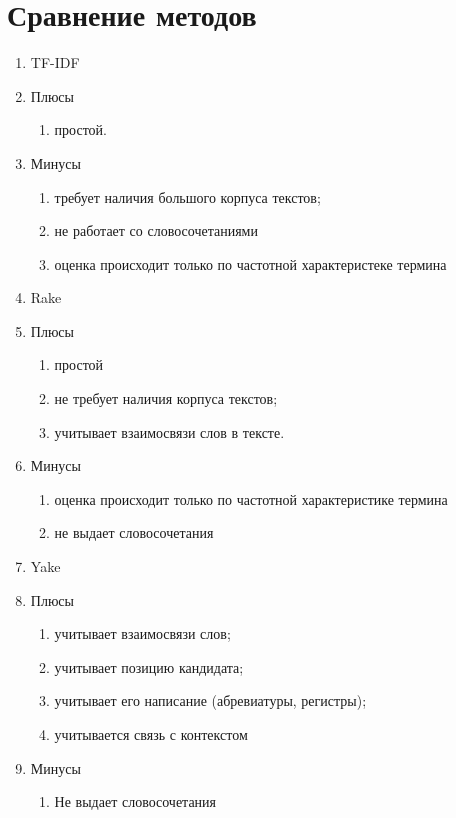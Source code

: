 \section{Сравнение методов}
\begin{enumerate}
	\item TF-IDF
	\item Плюсы \begin{enumerate}
		\item простой.
	\end{enumerate}
	\item Минусы \begin{enumerate}
		\item требует наличия большого корпуса текстов;
		\item не работает со словосочетаниями
		\item оценка происходит только по частотной характеристеке термина
	\end{enumerate}
	\item Rake
	\item Плюсы \begin{enumerate}
		\item простой
		\item не требует наличия корпуса текстов;
		\item учитывает взаимосвязи слов в тексте.
	\end{enumerate}
	\item Минусы \begin{enumerate}
		\item оценка происходит только по частотной характеристике термина
		\item не выдает словосочетания
	\end{enumerate}
	\item Yake
	\item Плюсы \begin{enumerate}
		\item учитывает взаимосвязи слов;
		\item учитывает позицию кандидата;
		\item учитывает его написание (абревиатуры, регистры);
		\item учитывается связь с контекстом
	\end{enumerate}
	\item Минусы \begin{enumerate}
		\item Не выдает словосочетания
	\end{enumerate}
\end{enumerate}

